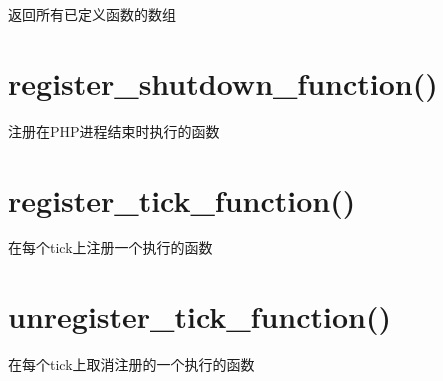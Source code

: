 返回所有已定义函数的数组


\section{register\_shutdown\_function()}

注册在PHP进程结束时执行的函数


\section{register\_tick\_function()}

在每个tick上注册一个执行的函数


\section{unregister\_tick\_function()}

在每个tick上取消注册的一个执行的函数










